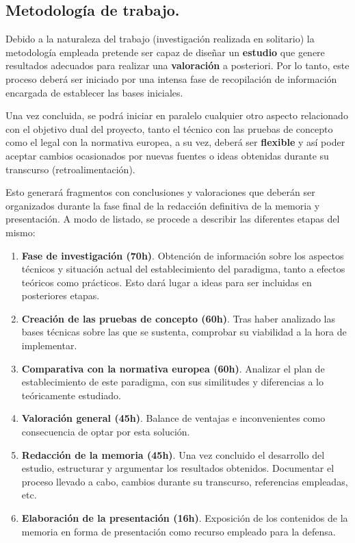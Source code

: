 \documentclass[../main.tex]{subfiles}
\begin{document}
\newpage

\subsection{Metodología de trabajo.}
Debido a la naturaleza del trabajo (investigación realizada en solitario) la metodología empleada pretende ser capaz de diseñar un \textbf{estudio} que genere resultados adecuados para realizar una \textbf{valoración} a posteriori. Por lo tanto, este proceso deberá ser iniciado por una intensa fase de recopilación de información encargada de establecer las bases iniciales.

Una vez concluida, se podrá iniciar en paralelo cualquier otro aspecto relacionado con el objetivo dual del proyecto, tanto el técnico con las pruebas de concepto como el legal con la normativa europea, a su vez, deberá ser \textbf{flexible} y así poder aceptar cambios ocasionados por nuevas fuentes o ideas obtenidas durante su transcurso (retroalimentación). 

Esto generará fragmentos con conclusiones y valoraciones que deberán ser organizados durante la fase final de la redacción definitiva de la memoria y presentación. A modo de listado, se procede a describir las diferentes etapas del mismo:

\begin{enumerate}
    
    \item \textbf{Fase de investigación (70h)}. 
    Obtención de información sobre los aspectos técnicos y situación actual del establecimiento del paradigma, tanto a efectos teóricos como prácticos. Esto dará lugar a ideas para ser incluidas en posteriores etapas.
    
    \item \textbf{Creación de las pruebas de concepto (60h)}. 
    Tras haber analizado las bases técnicas sobre las que se sustenta, comprobar su viabilidad a la hora de implementar.
    
    \item \textbf{Comparativa con la normativa europea (60h)}. 
    Analizar el plan de establecimiento de este paradigma, con sus similitudes y diferencias a lo teóricamente estudiado.
    
    \item \textbf{Valoración general (45h)}. 
    Balance de ventajas e inconvenientes como consecuencia de optar por esta solución.
    
    \item \textbf{Redacción de la memoria (45h)}. 
    Una vez concluido el desarrollo del estudio, estructurar y argumentar los resultados obtenidos. Documentar el proceso llevado a cabo, cambios durante su transcurso, referencias empleadas, etc.
    
    \item \textbf{Elaboración de la presentación (16h)}. 
    Exposición de los contenidos de la memoria en forma de presentación como recurso empleado para la defensa.
    
\end{enumerate}
\end{document}
